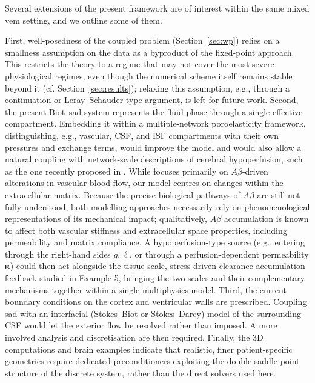 \documentclass[fleqn,a4paper]{cas-sc}
\newcommand{\bkappa}{\boldsymbol{\kappa}}
\newcommand{\0}{\boldsymbol{0}}
\numberwithin{equation}{section}
\numberwithin{figure}{section}
\begin{document}
{Several extensions of the present framework are of interest within the same mixed \gls{vem} setting, and we outline some of them.

First,   well-posedness of the coupled problem (Section~\ref{sec:wp}) relies on a smallness assumption on the data as a byproduct of the fixed-point approach. This restricts the theory to a regime that may not cover the most severe physiological regimes, even though the numerical scheme itself remains stable beyond it (cf. Section~\ref{sec:results}); relaxing this assumption, e.g., through a continuation or Leray--Schauder-type argument, is left for future work.
%
Second,  the present Biot--\gls{sad} system represents the fluid phase through a single effective compartment. Embedding it within a multiple-network poroelasticity  framework, distinguishing, e.g., vascular, CSF, and ISF compartments with their own pressures and exchange terms, would improve the model and would also allow a natural coupling with network-scale descriptions of cerebral hypoperfusion, such as the one recently proposed  in \cite{Corti26}. While  \cite{Corti26} focuses primarily on $A\beta$-driven alterations in vascular blood flow, our model centres on changes within the extracellular matrix. Because the precise biological pathways of $A\beta$ are still not fully understood, both modelling approaches necessarily rely on phenomenological representations of its mechanical impact; qualitatively, $A\beta$ accumulation is known to affect both vascular stiffness and extracellular space properties, including permeability and matrix compliance. A hypoperfusion-type source (e.g., entering through the right-hand sides $g,\ell$, or through a perfusion-dependent permeability $\bkappa$) could then act alongside the tissue-scale, stress-driven clearance-accumulation feedback studied in Example 5, 
bringing the two scales and their complementary mechanisms together within a single multiphysics model.
%
Third, the current boundary conditions on the cortex and ventricular walls are prescribed. Coupling \gls{sad} with an interfacial (Stokes--Biot or Stokes--Darcy) model of the surrounding CSF would let the exterior flow be resolved rather than imposed. A more involved analysis and discretisation are then required.
%
Finally, the 3D computations and brain examples  indicate that realistic, finer patient-specific geometries   require dedicated preconditioners exploiting the double saddle-point structure of the discrete system, rather than the direct solvers used here.}


\end{document}
